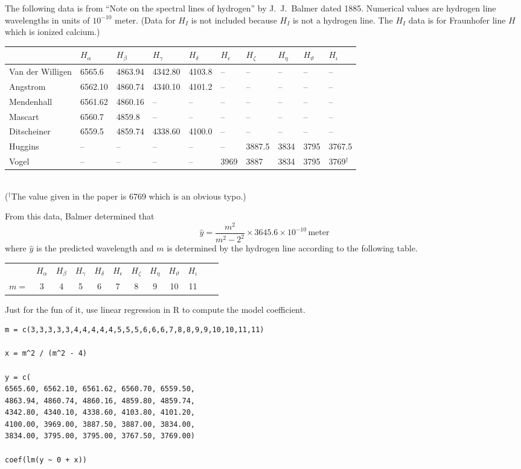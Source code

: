 \documentclass[12pt]{article}
\begin{document}
\noindent
The following data is from
``Note on the spectral lines of hydrogen''
by J.~J.~Balmer dated 1885.
Numerical values are hydrogen line wavelengths in units of $10^{-10}$ meter.
(Data for $H_I$ is not included because $H_I$ is not a hydrogen line.
The $H_I$ data is for Fraunhofer line $H$ which is ionized calcium.)
\begin{center}
\footnotesize
\begin{tabular}{|l|l|l|l|l|l|l|l|l|l|}
\hline
 & $H_\alpha$ & $H_\beta$ & $H_\gamma$ & $H_\delta$ & $H_\epsilon$ &
$H_\zeta$ & $H_\eta$ & $H_\vartheta$ & $H_\iota$
\\
\hline
Van der Willigen & 6565.6 & 4863.94 & 4342.80 & 4103.8 & -- & -- & -- & -- & --
\\
Angstrom & 6562.10 & 4860.74 & 4340.10 & 4101.2 & -- & -- & -- & -- & --
\\
Mendenhall & 6561.62 & 4860.16 & -- & -- & -- & -- & -- & -- & --
\\
Mascart & 6560.7 & 4859.8 & -- & -- & -- & -- & -- & -- & --
\\
Ditscheiner & 6559.5 & 4859.74 & 4338.60 & 4100.0 & -- & -- & -- & -- & --
\\
Huggins & -- & -- & -- & -- & -- & 3887.5 & 3834 & 3795 & 3767.5
\\
Vogel & -- & -- & -- & -- & 3969 & 3887 & 3834 & 3795 & 3769${}^\dag$
\\
\hline
\end{tabular}
\\
{\footnotesize(${}^\dag$The value given in the paper is 6769 which is an obvious typo.)}
\end{center}

\noindent
From this data, Balmer determined that
\begin{equation*}
\hat{y}=\frac{m^2}{m^2-2^2}\times3645.6\times10^{-10}\,\text{meter}
\end{equation*}
where $\hat{y}$ is the predicted wavelength and $m$ is determined by the hydrogen line
according to the following table.
\begin{center}
\begin{tabular}{cccccccccccc}
& $H_\alpha$ & $H_\beta$ & $H_\gamma$ & $H_\delta$ & $H_\epsilon$ &
$H_\zeta$ & $H_\eta$ & $H_\vartheta$ & $H_\iota$
\\
$m=$ & 3 & 4 & 5 & 6 & 7 & 8 & 9 & 10 & 11
\end{tabular}
\end{center}

\noindent
Just for the fun of it, use linear regression in R to compute the model coefficient.
{\footnotesize\color{blue}
\begin{verbatim}
m = c(3,3,3,3,3,4,4,4,4,4,5,5,5,6,6,6,7,8,8,9,9,10,10,11,11)

x = m^2 / (m^2 - 4)

y = c(
6565.60, 6562.10, 6561.62, 6560.70, 6559.50,
4863.94, 4860.74, 4860.16, 4859.80, 4859.74,
4342.80, 4340.10, 4338.60, 4103.80, 4101.20,
4100.00, 3969.00, 3887.50, 3887.00, 3834.00,
3834.00, 3795.00, 3795.00, 3767.50, 3769.00)

coef(lm(y ~ 0 + x))
\end{verbatim}
}
\end{document}
